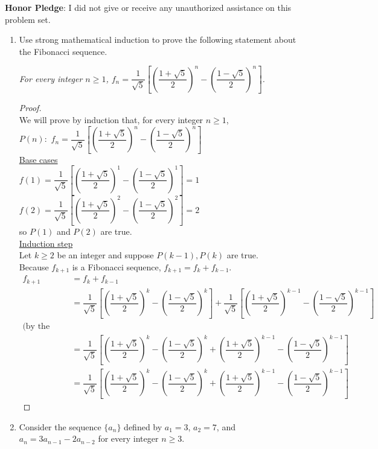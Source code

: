 \documentclass[12pt]{amsart}
\begin{document}
\vfill
\noindent
\textbf{Honor Pledge}: I did not give or receive any unauthorized assistance on this problem set.

\vspace{0.5in}
\hfill\makebox[3.0in]{\hrulefill}

\hfill{}

\newpage
\begin{enumerate}[{\bfseries 1.}]
\item Use strong mathematical induction to prove the following statement about the Fibonacci sequence.

	\vspace{0.1in}
	\begin{center}
	\noindent
	\textit{For every integer $n\geq 1$, $f_{n}=\dfrac{1}{\sqrt{5}}\left[\left(\dfrac{1+\sqrt{5}}{2}\right)^{n}-\left(\dfrac{1-\sqrt{5}}{2}\right)^{n}\right]$.}
	\end{center}
	\begin{proof}
	\\We will prove by induction that, for every integer $n \geq 1$, 
	\\$P(n):$ $f_{n}=\dfrac{1}{\sqrt{5}}\left[\left(\dfrac{1+\sqrt{5}}{2}\right)^{n}-\left(\dfrac{1-\sqrt{5}}{2}\right)^{n}\right]$
	\\\underline{Base cases}
	\\$f(1) =\dfrac{1}{\sqrt{5}}\left[\left(\dfrac{1+\sqrt{5}}{2}\right)^{1}-\left(\dfrac{1-\sqrt{5}}{2}\right)^{1}\right] = 1$
	\\$f(2) = \dfrac{1}{\sqrt{5}}\left[\left(\dfrac{1+\sqrt{5}}{2}\right)^{2}-\left(\dfrac{1-\sqrt{5}}{2}\right)^{2}\right] = 2$
	\\so $P(1)$ and $P(2)$ are true.
	\\\underline{Induction step}
	\\Let $k\geq 2$ be an integer and suppose $P(k-1), P(k)$ are true.
	\\Because $f_{k+1}$ is a Fibonacci sequence, $f_{k+1} = f_{k} + f_{k-1}$.
	\begin{align*}
	    f_{k+1} &= f_{k} + f_{k-1}\\
		&= \dfrac{1}{\sqrt{5}}\left[\left(\dfrac{1+\sqrt{5}}{2}\right)^{k}-\left(\dfrac{1-\sqrt{5}}{2}\right)^{k}\right] + \dfrac{1}{\sqrt{5}}\left[\left(\dfrac{1+\sqrt{5}}{2}\right)^{k-1}-\left(\dfrac{1-\sqrt{5}}{2}\right)^{k-1}\right]
		\\\text{(by the induction hypothesis)} \\
		&= \dfrac{1}{\sqrt{5}}\left[\left(\dfrac{1+\sqrt{5}}{2}\right)^{k}-\left(\dfrac{1-\sqrt{5}}{2}\right)^{k}+\left(\dfrac{1+\sqrt{5}}{2}\right)^{k-1}-\left(\dfrac{1-\sqrt{5}}{2}\right)^{k-1}\right]\\
		&= \dfrac{1}{\sqrt{5}}\left[\left(\dfrac{1+\sqrt{5}}{2}\right)^{k}-\left(\dfrac{1-\sqrt{5}}{2}\right)^{k}+\left(\dfrac{1+\sqrt{5}}{2}\right)^{k-1}-\left(\dfrac{1-\sqrt{5}}{2}\right)^{k-1}\right]
		\end{align*}
	\end{proof}
\newpage
\item Consider the sequence $\{a_{n}\}$ defined by $a_{1}=3$, $a_{2}=7$, and $a_{n}=3a_{n-1}-2a_{n-2}$ for every integer $n\geq 3$.


\end{enumerate}
\end{document}
